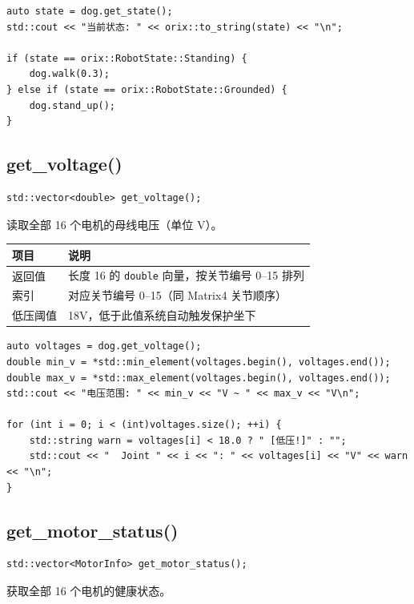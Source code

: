 \documentclass[a4paper,11pt,openany]{book}
\begin{document}
\begin{lstlisting}[style=cpp]
auto state = dog.get_state();
std::cout << "当前状态: " << orix::to_string(state) << "\n";

if (state == orix::RobotState::Standing) {
    dog.walk(0.3);
} else if (state == orix::RobotState::Grounded) {
    dog.stand_up();
}
\end{lstlisting}

\subsection{get\_voltage()}

\begin{lstlisting}[style=cpp,numbers=none]
std::vector<double> get_voltage();
\end{lstlisting}

读取全部 16 个电机的母线电压（单位 V）。

\begin{longtable}{ll}
\toprule
项目 & 说明 \\
\midrule
\endhead
返回值 & 长度 16 的 \texttt{double} 向量，按关节编号 0--15 排列 \\
索引 & 对应关节编号 0--15（同 Matrix4 关节顺序）\\
低压阈值 & 18V，低于此值系统自动触发保护坐下 \\
\bottomrule
\end{longtable}

\begin{lstlisting}[style=cpp]
auto voltages = dog.get_voltage();
double min_v = *std::min_element(voltages.begin(), voltages.end());
double max_v = *std::max_element(voltages.begin(), voltages.end());
std::cout << "电压范围: " << min_v << "V ~ " << max_v << "V\n";

for (int i = 0; i < (int)voltages.size(); ++i) {
    std::string warn = voltages[i] < 18.0 ? " [低压!]" : "";
    std::cout << "  Joint " << i << ": " << voltages[i] << "V" << warn << "\n";
}
\end{lstlisting}

\subsection{get\_motor\_status()}

\begin{lstlisting}[style=cpp,numbers=none]
std::vector<MotorInfo> get_motor_status();
\end{lstlisting}

获取全部 16 个电机的健康状态。
\end{document}
